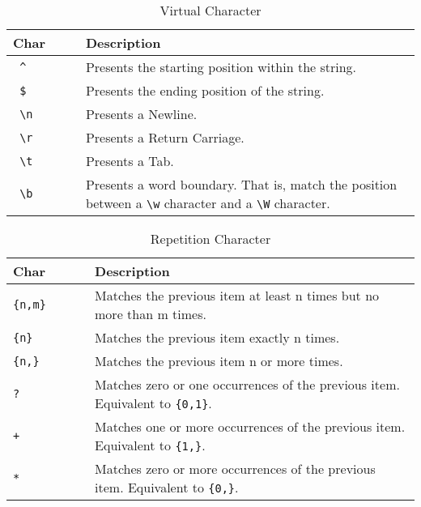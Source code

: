 \begin{table}[ht]
\caption{Virtual Character}
\centering
\begin{tabular}{l p{8cm} }
\hline\hline
Char & Description \\[0.5ex]
\hline
\verb/ ^           / & Presents the starting position within the string. \\
\verb/ $ / & Presents the ending position of the string.\\
\verb/ \n / & Presents a Newline. \\
\verb/ \r / & Presents a Return Carriage. \\
\verb/ \t / & Presents a Tab. \\
\verb/ \b / & Presents a word boundary. That is, match the position between a \verb/\w/ character and a \verb/\W/ character.\\
\hline
\end{tabular}
\label{table:vc}
\end{table}

\begin{table}[ht]
\caption{Repetition Character}
\centering
\begin{tabular}{l p{8cm}}
\hline\hline
Char & Description \\[0.5ex]
\hline
\verb/{n,m}        / & Matches the previous item at least n times but no more than m times.\\
\verb/{n}/ & Matches the previous item exactly n times.\\
\verb/{n,}/ & Matches the previous item n or more times.\\
\verb/?/ & Matches zero or one occurrences of the previous item. Equivalent to \verb/{0,1}/. \\
\verb/+/ & Matches one or more occurrences of the previous item. Equivalent to \verb/{1,}/.\\
\verb/*/ & Matches zero or more occurrences of the previous item. Equivalent to \verb/{0,}/.\\

\hline
\end{tabular}
\label{table:rc}
\end{table}


